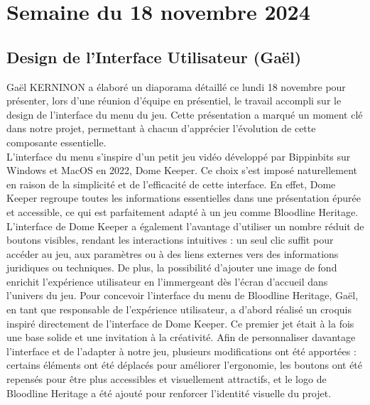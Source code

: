 \documentclass{report}
\begin{document}
\newpage
\section{Semaine du 18 novembre 2024}

\subsection*{Design de l'Interface Utilisateur (Gaël)}
Gaël KERNINON a élaboré un diaporama détaillé ce lundi 18 novembre pour présenter, lors d'une réunion d'équipe en présentiel, le travail accompli sur le design de l'interface du menu du jeu. Cette présentation a marqué un moment clé dans notre projet, permettant à chacun d’apprécier l’évolution de cette composante essentielle.
\\[0.4cm]
L’interface du menu s’inspire d’un petit jeu vidéo développé par Bippinbits sur Windows et MacOS en 2022, Dome Keeper. Ce choix s'est imposé naturellement en raison de la simplicité et de l'efficacité de cette interface. En effet, Dome Keeper regroupe toutes les informations essentielles dans une présentation épurée et accessible, ce qui est parfaitement adapté à un jeu comme Bloodline Heritage. L'interface de Dome Keeper a également l'avantage d'utiliser un nombre réduit de boutons visibles, rendant les interactions intuitives : un seul clic suffit pour accéder au jeu, aux paramètres ou à des liens externes vers des informations juridiques ou techniques. De plus, la possibilité d’ajouter une image de fond enrichit l’expérience utilisateur en l’immergeant dès l’écran d’accueil dans l’univers du jeu. Pour concevoir l’interface du menu de Bloodline Heritage, Gaël, en tant que responsable de l’expérience utilisateur, a d’abord réalisé un croquis inspiré directement de l’interface de Dome Keeper. Ce premier jet était à la fois une base solide et une invitation à la créativité. Afin de personnaliser davantage l’interface et de l’adapter à notre jeu, plusieurs modifications ont été apportées : certains éléments ont été déplacés pour améliorer l’ergonomie, les boutons ont été repensés pour être plus accessibles et visuellement attractifs, et le logo de Bloodline Heritage a été ajouté pour renforcer l’identité visuelle du projet.
\\[0.4cm]
\end{document}
